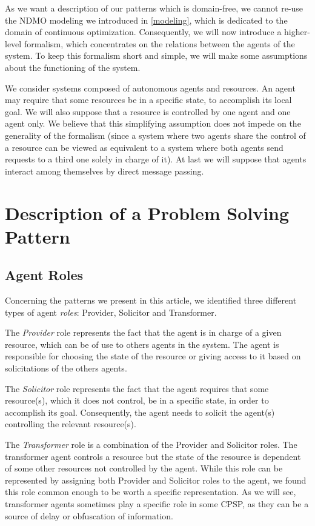 As we want a description of our patterns which is domain-free, we cannot re-use the NDMO modeling we introduced in \ref{modeling}, which is dedicated to the domain of continuous optimization. Consequently, we will now introduce a higher-level formalism, which concentrates on the relations between the agents of the system. To keep this formalism short and simple, we will make some assumptions about the functioning of the system.

We consider systems composed of autonomous agents and resources. An agent may require that some resources be in a specific state, to accomplish its local goal. We will also suppose that a resource is controlled by one agent and one agent only. We believe that this simplifying assumption does not impede on the generality of the formalism (since a system where two agents share the control of a resource can be viewed as equivalent to a system where both agents send requests to a third one solely in charge of it). At last we will suppose that agents interact among themselves by direct message passing.

\section{Description of a Problem Solving Pattern}

\subsection{Agent Roles}\label{CPSP_roles}

Concerning the patterns we present in this article, we identified three different types of agent \emph{roles}: Provider, Solicitor and Transformer.

The \emph{Provider} role represents the fact that the agent is in charge of a given resource, which can be of use to others agents in the system. The agent is responsible for choosing the state of the resource or giving access to it based on solicitations of the others agents.

The \emph{Solicitor} role represents the fact that the agent requires that some resource(s), which it does not control, be in a specific state, in order to accomplish its goal. Consequently, the agent needs to solicit the agent(s) controlling the relevant resource(s).

The \emph{Transformer} role is a combination of the Provider and Solicitor roles. The transformer agent controls a resource but the state of the resource is dependent of some other resources not controlled by the agent. While this role can be represented by assigning both Provider and Solicitor roles to the agent, we found this role common enough to be worth a specific representation. As we will see, transformer agents sometimes play a specific role in some CPSP, as they can be a source of delay or obfuscation of information.

